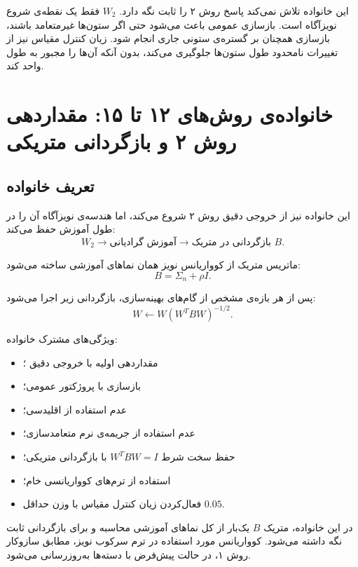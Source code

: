 \documentclass[a4paper,12pt]{article}
\newcommand{\NPtwo}{\lr{NoiseProj2}}
\newcommand{\QR}{\lr{QR}}
\newcommand{\EMA}{\lr{EMA}}
\begin{document}
این خانواده تلاش نمی‌کند پاسخ روش ۲ را ثابت نگه دارد. $W_2$ فقط یک نقطه‌ی شروع نویزآگاه است. بازسازی عمومی باعث می‌شود حتی اگر ستون‌ها غیرمتعامد باشند، بازسازی همچنان بر گستره‌ی ستونی جاری انجام شود. زیان کنترل مقیاس نیز از تغییرات نامحدود طول ستون‌ها جلوگیری می‌کند، بدون آنکه آن‌ها را مجبور به طول واحد کند.

\section{خانواده‌ی روش‌های ۱۲ تا ۱۵: مقداردهی روش ۲ و بازگردانی متریکی}

\subsection{تعریف خانواده}

این خانواده نیز از خروجی دقیق روش ۲ شروع می‌کند، اما هندسه‌ی نویزآگاه آن را در طول آموزش حفظ می‌کند:
\begin{equation}
 W_2
 \longrightarrow
 \text{آموزش گرادیانی}
 \longrightarrow
 \text{بازگردانی در متریک }B.
\end{equation}

ماتریس متریک از کوواریانس نویز همان نماهای آموزشی ساخته می‌شود:
\begin{equation}
 B=\Sigma_n+\rho I.
\end{equation}

پس از هر بازه‌ی مشخص از گام‌های بهینه‌سازی، بازگردانی زیر اجرا می‌شود:
\begin{equation}
 W\leftarrow W\left(W^{T}BW\right)^{-1/2}.
\end{equation}

ویژگی‌های مشترک خانواده:
\begin{itemize}
 \item مقداردهی اولیه با خروجی دقیق \NPtwo{}؛
 \item بازسازی با پروژکتور عمومی؛
 \item عدم استفاده از \QR{} اقلیدسی؛
 \item عدم استفاده از جریمه‌ی نرم متعامدسازی؛
 \item حفظ سخت شرط $W^{T}BW=I$ با بازگردانی متریکی؛
 \item استفاده از ترم‌های کوواریانسی خام؛
 \item فعال‌کردن زیان کنترل مقیاس با وزن حداقل $0.05$.
\end{itemize}

در این خانواده، متریک $B$ یک‌بار از کل نماهای آموزشی محاسبه و برای بازگردانی ثابت نگه داشته می‌شود. کوواریانس مورد استفاده در ترم سرکوب نویز، مطابق سازوکار روش ۱، در حالت پیش‌فرض با \EMA{} دسته‌ها به‌روزرسانی می‌شود.
\end{document}

